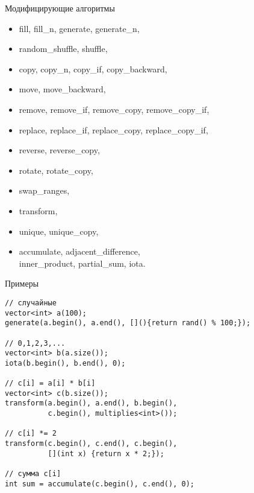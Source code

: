 \documentclass[aspectration=1610,t]{beamer}
\begin{document}
\begin{frame}[fragile]{Модифицирующие алгоритмы}
\begin{itemize}
    \tt
    \item fill, fill\_n, generate, generate\_n,
    \item random\_shuffle, shuffle,
    \item copy, copy\_n, copy\_if, copy\_backward,
    \item move, move\_backward,
    \item remove, remove\_if, remove\_copy, remove\_copy\_if,
    \item replace, replace\_if, replace\_copy, replace\_copy\_if,
    \item reverse, reverse\_copy,
    \item rotate, rotate\_copy,
    \item swap\_ranges,  
    \item transform,
    \item unique, unique\_copy,
    \item[\textbf{\textasteriskcentered}] accumulate, adjacent\_difference,\\ inner\_product, partial\_sum, iota.
\end{itemize}
\end{frame}

\begin{frame}[fragile]{Примеры}
\begin{lstlisting}
// случайныe
vector<int> a(100); 
generate(a.begin(), a.end(), [](){return rand() % 100;});

// 0,1,2,3,...
vector<int> b(a.size()); 
iota(b.begin(), b.end(), 0);

// c[i] = a[i] * b[i]
vector<int> c(b.size()); 
transform(a.begin(), a.end(), b.begin(), 
          c.begin(), multiplies<int>());

// c[i] *= 2 
transform(c.begin(), c.end(), c.begin(), 
          [](int x) {return x * 2;});

// сумма c[i]
int sum = accumulate(c.begin(), c.end(), 0);
\end{lstlisting}
\end{frame}
\end{document}

